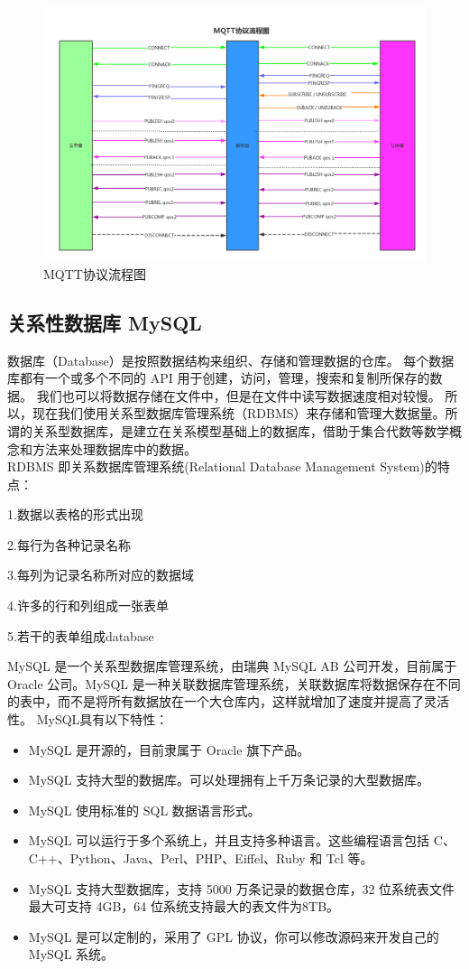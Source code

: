 \begin{figure}[htbp]
	\centering
	\includegraphics[width=1\linewidth]{figure/3-1}
	\caption{MQTT协议流程图}
	\label{fig:3-1}
\end{figure}


\subsection{关系性数据库 MySQL}


数据库（Database）是按照数据结构来组织、存储和管理数据的仓库。
每个数据库都有一个或多个不同的 API 用于创建，访问，管理，搜索和复制所保存的数据。
我们也可以将数据存储在文件中，但是在文件中读写数据速度相对较慢。
所以，现在我们使用关系型数据库管理系统（RDBMS）来存储和管理大数据量。所谓的关系型数据库，是建立在关系模型基础上的数据库，借助于集合代数等数学概念和方法来处理数据库中的数据。
\\RDBMS 即关系数据库管理系统(Relational Database Management System)的特点：

1.数据以表格的形式出现

2.每行为各种记录名称

3.每列为记录名称所对应的数据域

4.许多的行和列组成一张表单

5.若干的表单组成database


MySQL 是一个关系型数据库管理系统，由瑞典 MySQL AB 公司开发，目前属于 Oracle 公司。MySQL 是一种关联数据库管理系统，关联数据库将数据保存在不同的表中，而不是将所有数据放在一个大仓库内，这样就增加了速度并提高了灵活性。
MySQL具有以下特性：
\begin{itemize}
	\item MySQL 是开源的，目前隶属于 Oracle 旗下产品。
	\item MySQL 支持大型的数据库。可以处理拥有上千万条记录的大型数据库。
	\item MySQL 使用标准的 SQL 数据语言形式。
	\item MySQL 可以运行于多个系统上，并且支持多种语言。这些编程语言包括 C、C++、Python、Java、Perl、PHP、Eiffel、Ruby 和 Tcl 等。
	\item MySQL 支持大型数据库，支持 5000 万条记录的数据仓库，32 位系统表文件最大可支持 4GB，64 位系统支持最大的表文件为8TB。
	\item MySQL 是可以定制的，采用了 GPL 协议，你可以修改源码来开发自己的 MySQL 系统。
\end{itemize}

